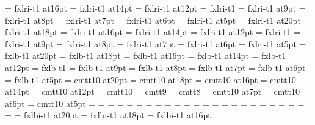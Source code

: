 \font\sixteenit=    fxlri-t1 at16pt
\font\fourteenit=   fxlri-t1 at14pt
\font\twelveit=     fxlri-t1 at12pt
\font\tenit=        fxlri-t1
\font\nineit=       fxlri-t1 at9pt
\font\eightit=      fxlri-t1 at8pt
\font\sevenit=      fxlri-t1 at7pt
\font\sixit=        fxlri-t1 at6pt
\font\fiveit=       fxlri-t1 at5pt
%
\font\twentysl=     fxlri-t1 at20pt
\font\eighteensl=   fxlri-t1 at18pt
\font\sixteensl=    fxlri-t1 at16pt
\font\fourteensl=   fxlri-t1 at14pt
\font\twelvesl=     fxlri-t1 at12pt
\font\tensl=        fxlri-t1
\font\ninesl=       fxlri-t1 at9pt
\font\eightsl=      fxlri-t1 at8pt
\font\sevensl=      fxlri-t1 at7pt
\font\sixsl=        fxlri-t1 at6pt
\font\fivesl=       fxlri-t1 at5pt
%
\font\twentybf=     fxlb-t1 at20pt
\font\eighteenbf=   fxlb-t1 at18pt
\font\sixteenbf=    fxlb-t1 at16pt
\font\fourteenbf=   fxlb-t1 at14pt
\font\twelvebf=     fxlb-t1 at12pt
\font\tenbf=        fxlb-t1
\font\ninebf=       fxlb-t1 at9pt
\font\eightbf=      fxlb-t1 at8pt
\font\sevenbf=      fxlb-t1 at7pt
\font\sixbf=        fxlb-t1 at6pt
\font\fivebf=       fxlb-t1 at5pt
%
\font\twentytt=     cmtt10 at20pt
\font\eighteentt=   cmtt10 at18pt
\font\sixteentt=    cmtt10 at16pt
\font\fourteentt=   cmtt10 at14pt
\font\twelvett=     cmtt10 at12pt
\font\tentt=        cmtt10
\font\ninett=       cmtt9
\font\eighttt=      cmtt8
\font\seventt=      cmtt10 at7pt
\font\sixtt=        cmtt10 at6pt
\font\fivett=       cmtt10 at5pt
%
=\tenrm
{}=\sevenrm
{}=\fiverm
\def\rm{\fam=0 \tenrm}%
%
=\teni
{}=\seveni
{}=\fivei
\def\mit{\fam=1}%
%
=\tensy
{}=\sevensy
{}=\fivesy
\def\cal{\fam=2}%
%
=\tenex
{}=\sevenex
{}=\fiveex
%
\def\it{\fam=\itfam \tenit}%
\textfont\itfam=\tenit
\scriptfont\itfam=\sevenit
\scriptscriptfont\itfam=\fiveit
%
\def\sl{\fam=\slfam \tensl}%
\textfont\slfam=\tensl
\scriptfont\slfam=\sevensl
\scriptscriptfont\slfam=\fivesl
%
\def\bf{\fam=\bffam \tenbf}%
\textfont\bffam=\tenbf
\scriptfont\bffam=\sevenbf
\scriptscriptfont\bffam=\fivebf
%
\def\tt{\fam=\ttfam \tentt}%
\textfont\ttfam=\tentt
\scriptfont\ttfam=\seventt
\scriptscriptfont\ttfam=\fivett
%
\font\twentyitbf=      fxlbi-t1 at20pt
\font\eighteenitbf=    fxlbi-t1 at18pt
\font\sixteenitbf=     fxlbi-t1 at16pt
